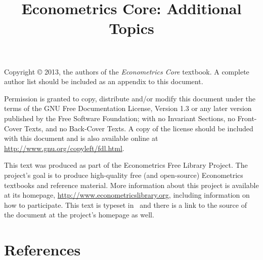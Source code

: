 \documentclass[nofonts]{tufte-latex/tufte-handout}
\title{Econometrics Core: Additional Topics}
\begin{document}
\maketitle

\bigskip\noindent%
Copyright © 2013, the authors of the \textit{Econometrics Core}
textbook.  A complete author list should be included as an appendix to
this document.

Permission is granted to copy, distribute and/or modify this document
under the terms of the GNU Free Documentation License, Version 1.3 or
any later version published by the Free Software Foundation; with no
Invariant Sections, no Front-Cover Texts, and no Back-Cover Texts.  A
copy of the license should be included with this document and is also
available online at \url{http://www.gnu.org/copyleft/fdl.html}.

This text was produced as part of the Econometrics Free Library
Project.  The project's goal is to produce high-quality free (and
open-source) Econometrics textbooks and reference material.  More
information about this project is available at its homepage,
\url{http://www.econometricslibrary.org}, including information on how
to participate.  This text is typeset in \XeLaTeX\ and there is a link
to the source of the document at the project's homepage as well.

%
\tableofcontents



% 

\part*{References}%

\end{document}

